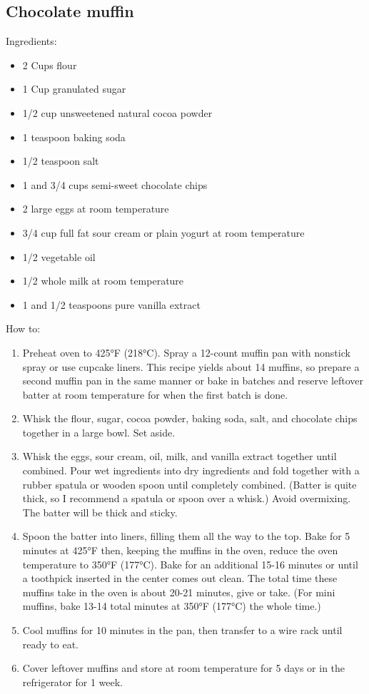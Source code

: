 \documentclass[a4paper, 12pt]{article}
\begin{document}
\subsection{Chocolate muffin}

Ingredients:

\begin{itemize}
	\item 2 Cups flour
	\item 1 Cup granulated sugar
	\item 1/2 cup unsweetened natural cocoa powder
	\item 1 teaspoon baking soda
	\item 1/2 teaspoon salt
	\item 1 and 3/4 cups semi-sweet chocolate chips
	\item 2 large eggs at room temperature
	\item 3/4 cup full fat sour cream or plain yogurt at room temperature
	\item 1/2 vegetable oil
	\item 1/2 whole milk at room temperature
	\item 1 and 1/2 teaspoons pure vanilla extract
\end{itemize}

How to:

\begin{enumerate}
	\item Preheat oven to 425°F (218°C). Spray a 12-count muffin pan with nonstick spray or use cupcake liners. This recipe yields about 14 muffins, so prepare a second muffin pan in the same manner or bake in batches and reserve leftover batter at room temperature for when the first batch is done.
	
	\item Whisk the flour, sugar, cocoa powder, baking soda, salt, and chocolate chips together in a large bowl. Set aside.
	
	\item Whisk the eggs, sour cream, oil, milk, and vanilla extract together until combined. Pour wet ingredients into dry ingredients and fold together with a rubber spatula or wooden spoon until completely combined. (Batter is quite thick, so I recommend a spatula or spoon over a whisk.) Avoid overmixing. The batter will be thick and sticky.
	
	\item Spoon the batter into liners, filling them all the way to the top. Bake for 5 minutes at 425°F then, keeping the muffins in the oven, reduce the oven temperature to 350°F (177°C). Bake for an additional 15-16 minutes or until a toothpick inserted in the center comes out clean. The total time these muffins take in the oven is about 20-21 minutes, give or take. (For mini muffins, bake 13-14 total minutes at 350°F (177°C) the whole time.)
	
	\item Cool muffins for 10 minutes in the pan, then transfer to a wire rack until ready to eat.
	
	\item Cover leftover muffins and store at room temperature for 5 days or in the refrigerator for 1 week.
\end{enumerate}
\end{document}
